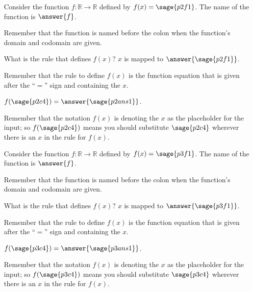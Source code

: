 \documentclass{ximera}
\begin{document}
\begin{problem}
    Consider the function $f:\mathbb{R}\rightarrow\mathbb{R}$ defined by $f(x) = \sage{p2f1}$. The name of the function is $\answer{f}$.
    \begin{feedback}
        Remember that the function is named before the colon when the function's domain and codomain are given.
    \end{feedback}
    \begin{problem}
        What is the rule that defines $f(x)$? $x$ is mapped to $\answer{\sage{p2f1}}$.
        \begin{feedback}
            Remember that the rule to define $f(x)$ is the function equation that is given after the ``$=$'' sign and containing the $x$.
        \end{feedback}
        \begin{problem}
            $f(\sage{p2c4}) = \answer{\sage{p2ans1}}$.
            \begin{feedback}
                Remember that the notation $f(x)$ is denoting the $x$ as the placeholder for the input; so $f(\sage{p2c4})$ means you should substitute $\sage{p2c4}$ wherever there is an $x$ in the rule for $f(x)$.
            \end{feedback}
        \end{problem}
    \end{problem}
    
\end{problem}


\begin{problem}
    Consider the function $f:\mathbb{R}\rightarrow\mathbb{R}$ defined by $f(x) = \sage{p3f1}$. The name of the function is $\answer{f}$.
    \begin{feedback}
        Remember that the function is named before the colon when the function's domain and codomain are given.
    \end{feedback}
    \begin{problem}
        What is the rule that defines $f(x)$? $x$ is mapped to $\answer{\sage{p3f1}}$.
        \begin{feedback}
            Remember that the rule to define $f(x)$ is the function equation that is given after the ``$=$'' sign and containing the $x$.
        \end{feedback}
        \begin{problem}
            $f(\sage{p3c4}) = \answer{\sage{p3ans1}}$.
            \begin{feedback}
                Remember that the notation $f(x)$ is denoting the $x$ as the placeholder for the input; so $f(\sage{p3c4})$ means you should substitute $\sage{p3c4}$ wherever there is an $x$ in the rule for $f(x)$.
            \end{feedback}
        \end{problem}
    \end{problem}
    
\end{problem}
\end{document}
